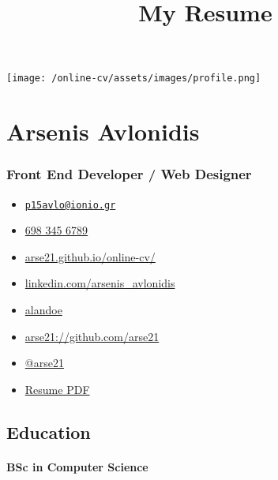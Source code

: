 \documentclass[
]{article}
\title{My Resume}
\author{}
\date{}
\providecommand{\tightlist}{%
  \setlength{\itemsep}{0pt}\setlength{\parskip}{0pt}}
\begin{document}
\maketitle

\texttt{[image: /online-cv/assets/images/profile.png]}

\hypertarget{arsenis-avlonidis}{%
\section{Arsenis Avlonidis}\label{arsenis-avlonidis}}

\hypertarget{front-end-developer-web-designer}{%
\subsubsection{Front End Developer / Web
Designer}\label{front-end-developer-web-designer}}

\begin{itemize}
\tightlist
\item
  \emph{} \href{mailto:p15avlo@ionio.gr}{\nolinkurl{p15avlo@ionio.gr}}
\item
  \emph{} \href{tel:698\%20345\%206789}{698 345 6789}
\item
  \emph{}
  \href{http://arse21.github.io/online-cv/}{arse21.github.io/online-cv/}
\item
  \emph{}
  \href{https://linkedin.com/in/linkedin.com/arsenis_avlonidis}{linkedin.com/arsenis\_avlonidis}
\item
  \emph{} \href{https://www.xing.com/profile/alandoe}{alandoe}
\item
  \emph{}
  \href{http://github.com/arse21://github.com/arse21}{arse21://github.com/arse21}
\item
  \emph{} \href{https://twitter.com/@arse21}{@arse21}
\item
  \emph{} \href{arse21.github.io/online-cv/print}{Resume PDF}
\end{itemize}

\hypertarget{education}{%
\subsection{Education}\label{education}}

\hypertarget{bsc-in-computer-science}{%
\paragraph{BSc in Computer Science}\label{bsc-in-computer-science}}
\end{document}

